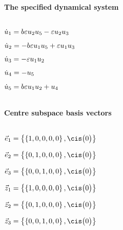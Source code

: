 
\(\)
\paragraph{The specified dynamical system}
\(
\)\par

\(\dot u_{1}=b \varepsilon u\sb2 u\sb5-\varepsilon u\sb2 u\sb3
\)\par

\(\dot u_{2}=-b \varepsilon u\sb1 u\sb5+\varepsilon u\sb1 u\sb3
\)\par

\(\dot u_{3}=-\varepsilon u\sb1 u\sb2
\)\par

\(\dot u_{4}=-u\sb5
\)\par

\(\dot u_{5}=b \varepsilon u\sb1 u\sb2+u\sb4
\)\par

\(\)
\paragraph{Centre subspace basis vectors}
\(
\)\par

\(\vec e_{1}=\left\{
\left\{
1 , 0 , 0 , 0 , 0
\right\} , \cis\big(0\big)
\right\}
\)\par

\(\vec e_{2}=\left\{
\left\{
0 , 1 , 0 , 0 , 0
\right\} , \cis\big(0\big)
\right\}
\)\par

\(\vec e_{3}=\left\{
\left\{
0 , 0 , 1 , 0 , 0
\right\} , \cis\big(0\big)
\right\}
\)\par

\(\vec z_{1}=\left\{
\left\{
1 , 0 , 0 , 0 , 0
\right\} , \cis\big(0\big)
\right\}
\)\par

\(\vec z_{2}=\left\{
\left\{
0 , 1 , 0 , 0 , 0
\right\} , \cis\big(0\big)
\right\}
\)\par

\(\vec z_{3}=\left\{
\left\{
0 , 0 , 1 , 0 , 0
\right\} , \cis\big(0\big)
\right\}
\)\par

